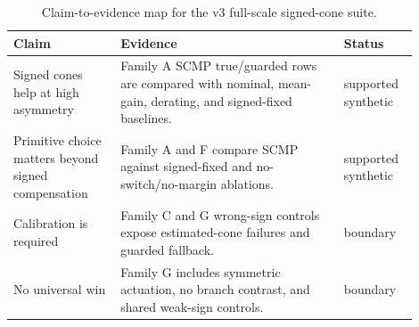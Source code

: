 \begin{table}[t]
\centering
\scriptsize
\caption{Claim-to-evidence map for the v3 full-scale signed-cone suite.}
\label{tab:claim-evidence}
\begin{tabular}{p{0.24\linewidth}p{0.50\linewidth}p{0.16\linewidth}}
\toprule
Claim & Evidence & Status \\
\midrule
Signed cones help at high asymmetry & Family A SCMP true/guarded rows are compared with nominal, mean-gain, derating, and signed-fixed baselines. & supported synthetic \\
Primitive choice matters beyond signed compensation & Family A and F compare SCMP against signed-fixed and no-switch/no-margin ablations. & supported synthetic \\
Calibration is required & Family C and G wrong-sign controls expose estimated-cone failures and guarded fallback. & boundary \\
No universal win & Family G includes symmetric actuation, no branch contrast, and shared weak-sign controls. & boundary \\
\bottomrule
\end{tabular}
\end{table}
